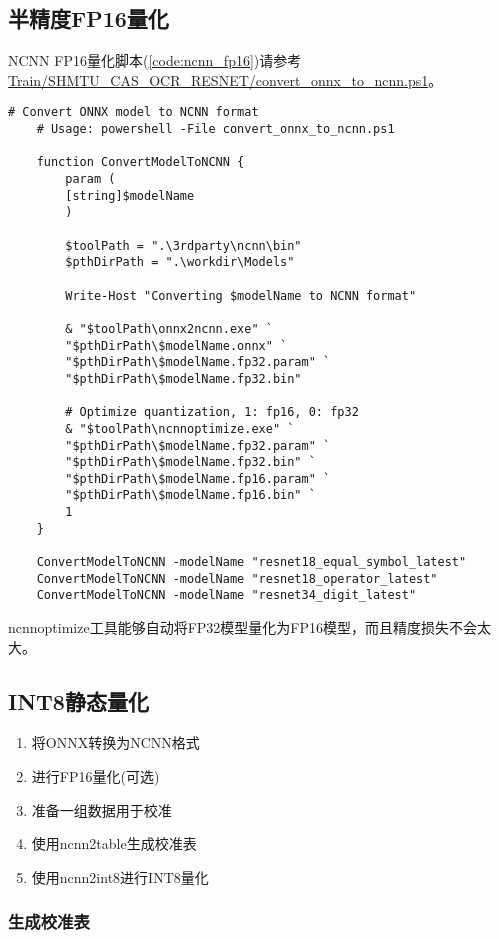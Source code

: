 \subsection{半精度FP16量化}

NCNN FP16量化脚本(\ref{code:ncnn_fp16})请参考\url{Train/SHMTU_CAS_OCR_RESNET/convert_onnx_to_ncnn.ps1}。

\begin{lstlisting}[caption={NCNN FP16量化},label=code:ncnn_fp16]
	# Convert ONNX model to NCNN format
	# Usage: powershell -File convert_onnx_to_ncnn.ps1

	function ConvertModelToNCNN {
		param (
		[string]$modelName
		)

		$toolPath = ".\3rdparty\ncnn\bin"
		$pthDirPath = ".\workdir\Models"

		Write-Host "Converting $modelName to NCNN format"

		& "$toolPath\onnx2ncnn.exe" `
		"$pthDirPath\$modelName.onnx" `
		"$pthDirPath\$modelName.fp32.param" `
		"$pthDirPath\$modelName.fp32.bin"

		# Optimize quantization, 1: fp16, 0: fp32
		& "$toolPath\ncnnoptimize.exe" `
		"$pthDirPath\$modelName.fp32.param" `
		"$pthDirPath\$modelName.fp32.bin" `
		"$pthDirPath\$modelName.fp16.param" `
		"$pthDirPath\$modelName.fp16.bin" `
		1
	}

	ConvertModelToNCNN -modelName "resnet18_equal_symbol_latest"
	ConvertModelToNCNN -modelName "resnet18_operator_latest"
	ConvertModelToNCNN -modelName "resnet34_digit_latest"

\end{lstlisting}

ncnnoptimize工具能够自动将FP32模型量化为FP16模型，而且精度损失不会太大。

\subsection{INT8静态量化}

\begin{enumerate}
	\item 将ONNX转换为NCNN格式
	\item 进行FP16量化(可选)
	\item 准备一组数据用于校准
	\item 使用ncnn2table生成校准表
	\item 使用ncnn2int8进行INT8量化
\end{enumerate}

\subsubsection{生成校准表}

